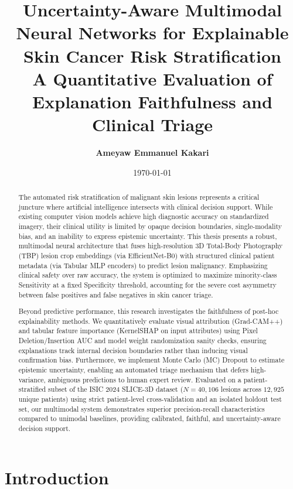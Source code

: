 \documentclass[12pt,a4paper]{report}
\title{
	\Huge \textbf{Uncertainty-Aware Multimodal Neural Networks for Explainable Skin Cancer Risk Stratification}\\[0.5em]
	\Large A Quantitative Evaluation of Explanation Faithfulness and Clinical Triage
}
\author{\textbf{Ameyaw Emmanuel Kakari}}
\date{\today}
\begin{document}
	
	\maketitle
	
	\begin{abstract}
		The automated risk stratification of malignant skin lesions represents a critical juncture where artificial intelligence intersects with clinical decision support. While existing computer vision models achieve high diagnostic accuracy on standardized imagery, their clinical utility is limited by opaque decision boundaries, single-modality bias, and an inability to express epistemic uncertainty. This thesis presents a robust, multimodal neural architecture that fuses high-resolution 3D Total-Body Photography (TBP) lesion crop embeddings (via EfficientNet-B0) with structured clinical patient metadata (via Tabular MLP encoders) to predict lesion malignancy. Emphasizing clinical safety over raw accuracy, the system is optimized to maximize minority-class Sensitivity at a fixed Specificity threshold, accounting for the severe cost asymmetry between false positives and false negatives in skin cancer triage. 
		
		Beyond predictive performance, this research investigates the faithfulness of post-hoc explainability methods. We quantitatively evaluate visual attribution (Grad-CAM++) and tabular feature importance (KernelSHAP on input attributes) using Pixel Deletion/Insertion AUC and model weight randomization sanity checks, ensuring explanations track internal decision boundaries rather than inducing visual confirmation bias. Furthermore, we implement Monte Carlo (MC) Dropout to estimate epistemic uncertainty, enabling an automated triage mechanism that defers high-variance, ambiguous predictions to human expert review. Evaluated on a patient-stratified subset of the ISIC 2024 SLICE-3D dataset ($N=40,106$ lesions across $12,925$ unique patients) using strict patient-level cross-validation and an isolated holdout test set, our multimodal system demonstrates superior precision-recall characteristics compared to unimodal baselines, providing calibrated, faithful, and uncertainty-aware decision support.
	\end{abstract}
	
	
	\tableofcontents
	\newpage
	
	\chapter{Introduction}
	\label{ch:intro}
	
\end{document}
